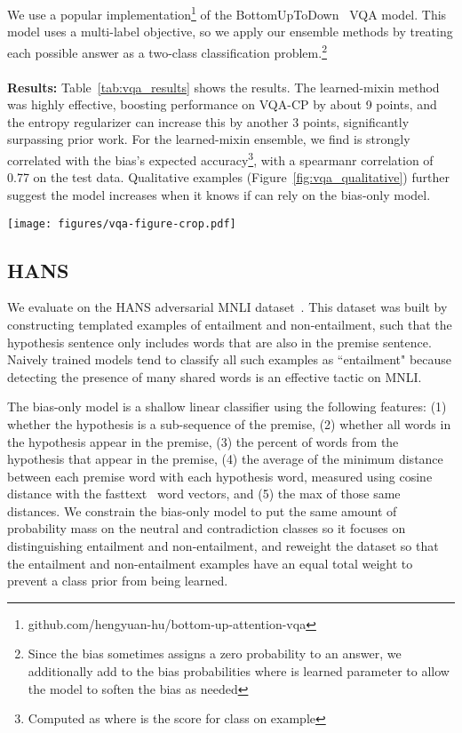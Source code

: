 \documentclass[11pt,a4paper]{article}
\begin{document}
 We use a popular implementation\footnote{github.com/hengyuan-hu/bottom-up-attention-vqa} of the BottomUpToDown~\cite{bottomuptopdown} VQA model. This model uses a multi-label objective, so we apply our ensemble methods by treating each possible answer as a two-class classification problem.\footnote{Since the bias sometimes assigns a zero probability to an answer, we additionally add  to the bias probabilities where  is learned parameter to allow the model to soften the bias as needed}
\\
\\
\textbf{Results:} Table~\ref{tab:vqa_results} shows the results. The learned-mixin method was highly effective, boosting performance on VQA-CP by about 9 points, and the entropy regularizer can increase this by another 3 points, significantly surpassing prior work. 
For the learned-mixin ensemble, we find  is strongly correlated with the bias's expected accuracy\footnote{Computed as  where  is the score for class  on example }, with a spearmanr correlation of 0.77 on the test data. Qualitative examples (Figure~\ref{fig:vqa_qualitative}) further suggest the model increases  when it knows if can rely on the bias-only model.

\begin{figure*}[t]
    \centering
    \texttt{[image: figures/vqa-figure-crop.pdf]} 
    \caption{Qualitative examples of the values of  on the VQA-CP training data for the learned-mixin model (labelled ``G'') and learned-mixin +H model (labelled ``G+''). The question type and the bias model's highest ranked answer for that type are shown above. We find  is larger when the bias answers are likely to be correct.}
    \label{fig:vqa_qualitative}
\end{figure*}
\subsection{HANS}
 We evaluate on the HANS adversarial MNLI dataset~\cite{mccoy2019right}. This dataset was built by constructing templated examples of entailment and non-entailment, such that the hypothesis sentence only includes words that are also in the premise sentence. Naively trained models tend to classify all such examples as ``entailment" because detecting the presence of many shared words is an effective tactic on MNLI.

 The bias-only model is a shallow linear classifier using the following features: (1) whether the hypothesis is a sub-sequence of the premise, (2) whether all words in the hypothesis appear in the premise, (3) the percent of words from the hypothesis that appear in the premise, (4) the average of the minimum distance between each premise word with each hypothesis word, measured using cosine distance with the fasttext~\cite{fasttext_word_vectors} word vectors, and (5) the max of those same distances. We constrain the bias-only model to put the same amount of probability mass on the neutral and contradiction classes so it focuses on distinguishing entailment and non-entailment, and reweight the dataset so that the entailment and non-entailment examples have an equal total weight to prevent a class prior from being learned.
\end{document}
